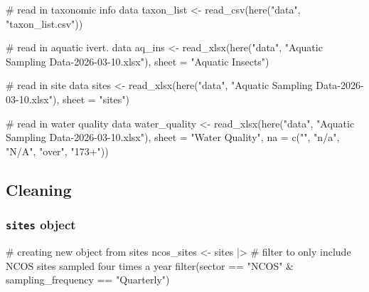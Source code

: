 \documentclass[
  letterpaper,
  DIV=11,
  numbers=noendperiod]{scrartcl}
\newenvironment{Shaded}{\begin{snugshade}}{\end{snugshade}}
\newcommand{\AttributeTok}[1]{\textcolor[rgb]{0.40,0.45,0.13}{#1}}
\newcommand{\CommentTok}[1]{\textcolor[rgb]{0.37,0.37,0.37}{#1}}
\newcommand{\FunctionTok}[1]{\textcolor[rgb]{0.28,0.35,0.67}{#1}}
\newcommand{\NormalTok}[1]{\textcolor[rgb]{0.00,0.23,0.31}{#1}}
\newcommand{\OtherTok}[1]{\textcolor[rgb]{0.00,0.23,0.31}{#1}}
\newcommand{\SpecialCharTok}[1]{\textcolor[rgb]{0.37,0.37,0.37}{#1}}
\newcommand{\StringTok}[1]{\textcolor[rgb]{0.13,0.47,0.30}{#1}}
\begin{document}
\begin{Shaded}
\begin{Highlighting}[]
\CommentTok{\# read in taxonomic info data}
\NormalTok{taxon\_list }\OtherTok{\textless{}{-}} \FunctionTok{read\_csv}\NormalTok{(}\FunctionTok{here}\NormalTok{(}\StringTok{"data"}\NormalTok{, }\StringTok{"taxon\_list.csv"}\NormalTok{))}

\CommentTok{\# read in aquatic ivert. data}
\NormalTok{aq\_ins }\OtherTok{\textless{}{-}} \FunctionTok{read\_xlsx}\NormalTok{(}\FunctionTok{here}\NormalTok{(}\StringTok{"data"}\NormalTok{, }\StringTok{"Aquatic Sampling Data{-}2026{-}03{-}10.xlsx"}\NormalTok{),}
                    \AttributeTok{sheet =} \StringTok{"Aquatic Insects"}\NormalTok{)}

\CommentTok{\# read in site data}
\NormalTok{sites }\OtherTok{\textless{}{-}} \FunctionTok{read\_xlsx}\NormalTok{(}\FunctionTok{here}\NormalTok{(}\StringTok{"data"}\NormalTok{, }\StringTok{"Aquatic Sampling Data{-}2026{-}03{-}10.xlsx"}\NormalTok{),}
                   \AttributeTok{sheet =} \StringTok{"sites"}\NormalTok{)}

\CommentTok{\# read in water quality data}
\NormalTok{water\_quality }\OtherTok{\textless{}{-}} \FunctionTok{read\_xlsx}\NormalTok{(}\FunctionTok{here}\NormalTok{(}\StringTok{"data"}\NormalTok{, }\StringTok{"Aquatic Sampling Data{-}2026{-}03{-}10.xlsx"}\NormalTok{),}
                           \AttributeTok{sheet =} \StringTok{"Water Quality"}\NormalTok{,}
                           \AttributeTok{na =} \FunctionTok{c}\NormalTok{(}\StringTok{""}\NormalTok{, }\StringTok{"n/a"}\NormalTok{, }\StringTok{"N/A"}\NormalTok{, }\StringTok{"over"}\NormalTok{, }\StringTok{"173+"}\NormalTok{)) }
\end{Highlighting}
\end{Shaded}

\subsection{Cleaning}\label{cleaning}

\subsubsection{\texorpdfstring{\texttt{sites}
object}{sites object}}\label{sites-object}

\begin{Shaded}
\begin{Highlighting}[]
\CommentTok{\# creating new object from sites}
\NormalTok{ncos\_sites }\OtherTok{\textless{}{-}}\NormalTok{ sites }\SpecialCharTok{|\textgreater{}} 
  \CommentTok{\# filter to only include NCOS sites sampled four times a year}
  \FunctionTok{filter}\NormalTok{(sector }\SpecialCharTok{==} \StringTok{"NCOS"} \SpecialCharTok{\&}\NormalTok{ sampling\_frequency }\SpecialCharTok{==} \StringTok{"Quarterly"}\NormalTok{)}
\end{Highlighting}
\end{Shaded}
\end{document}
